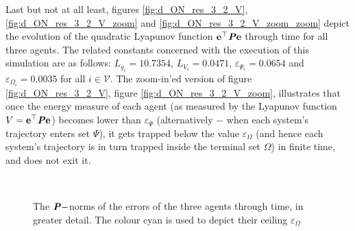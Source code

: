 Last but not at all least, figures
\eqref{fig:d_ON_res_3_2_V}, \eqref{fig:d_ON_res_3_2_V_zoom} and
\eqref{fig:d_ON_res_3_2_V_zoom_zoom} depict
the evolution of the quadratic Lyapunov function
$\bm{\mathbf{e}}^{\top} \bm{\mathit{P}} \bm{\mathbf{e}}$ through time for all three agents.
The related constants concerned with the execution
of this simulation are as follows: $L_{g_i} = 10.7354$, $L_{V_i} = 0.0471$,
$\varepsilon_{\Psi_i} = 0.0654$ and $\varepsilon_{\Omega_i} = 0.0035$ for
all $i \in \mathcal{V}$. The zoom-in'ed version of figure
\eqref{fig:d_ON_res_3_2_V}, figure \eqref{fig:d_ON_res_3_2_V_zoom},
illustrates that once the energy measure of each agent (as measured by
the Lyapunov function $V = \bm{\mathbf{e}}^{\top} \bm{\mathit{P}} \bm{\mathbf{e}}$) becomes lower than
$\varepsilon_{\Psi}$ (alternatively $-$ when each system's trajectory enters
set $\Psi$), it gets trapped below the value $\varepsilon_{\Omega}$ (and
hence each system's trajectory is in turn trapped inside the terminal
set $\Omega$) in finite time, and does not exit it.


\noindent{}\\[2.5ex]

\begin{figure}[H]\centering
  \scalebox{0.7}{}
  \caption{The $\bm{\mathit{P}}-$norms of the errors of the three agents through time,
    in greater detail. The colour cyan is used to depict their
    ceiling $\varepsilon_{\Omega}$}
  \label{fig:d_ON_res_3_2_V_zoom_zoom}
\end{figure}

